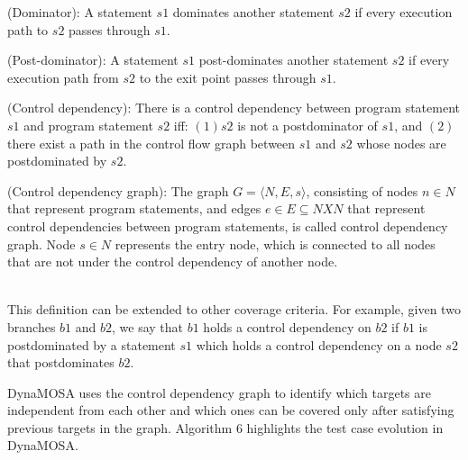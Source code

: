 \begin{definition}
    (Dominator): A statement $ s1 $ dominates another statement $ s2 $ if every execution path to $ s2 $ passes through $ s1 $.
\end{definition}
\begin{definition}
    (Post-dominator): A statement $ s1 $ post-dominates another statement $ s2 $ if every execution path from $ s2 $ to the exit point passes through $ s1 $. 
\end{definition}
\begin{definition}
    (Control dependency): There is a control dependency between program statement $ s1 $ and program statement $ s2 $ iff: $ (1) s2 $ is not a postdominator of $ s1 $, and $ (2) $ there exist a path in the control flow graph between $ s1 $ and $ s2 $ whose nodes are postdominated by $ s2 $.
\end{definition}
\begin{definition}
    (Control dependency graph): The graph $ G = \langle N, E, s \rangle $, consisting of nodes $ n \in N $ that represent program statements, and edges $ e \in E \subseteq N X N $ that represent control dependencies between program statements, is called control dependency graph. Node $ s \in N $ represents the entry node, which is connected to all nodes that are not under the control dependency of another node.
\end{definition}

\\
This definition can be extended to other coverage criteria. For example, given two branches $ b1 $ and $ b2 $,  we say that $ b1 $ holds a control dependency on $ b2 $ if $ b1 $ is postdominated by a statement $ s1 $ which holds a control dependency on a node $ s2 $ that postdominates $ b2 $.

DynaMOSA uses the control dependency graph to identify which targets are independent from each other and which ones can be covered only after satisfying previous targets in the graph.
Algorithm 6 highlights the test case evolution in DynaMOSA.

